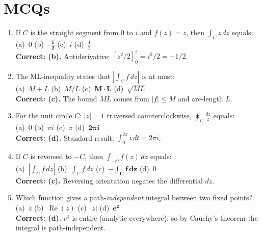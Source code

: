 \documentclass[12pt,a4paper]{article}
\begin{document}
\section{MCQs}
\begin{enumerate}[label=\textbf{Q\arabic*.}, leftmargin=*]

  \item If $C$ is the straight segment from $0$ to $i$ and $f(z)=z$, then
        $\int_C z\,dz$ equals:\\[2pt]
        (a)\ $0$ \quad
        (b)\ $\textbf{-}\,\mathbf{\tfrac{1}{2}}$\quad
        (c)\ $i$ \quad
        (d)\ $\tfrac{1}{2}$\\[2pt]
        \textbf{Correct: (b).}
        Antiderivative: $[z^2/2]_0^i = i^2/2 = -1/2$.

  \item The ML-inequality states that $|\int_C f\,dz|$ is at most:\\[2pt]
        (a)\ $M+L$ \quad
        (b)\ $M/L$ \quad
        (c)\ $\mathbf{M \cdot L}$ \quad
        (d)\ $\sqrt{ML}$\\[2pt]
        \textbf{Correct: (c).}
        The bound $ML$ comes from $|f|\le M$ and arc-length $L$.

  \item For the unit circle $C$: $|z|=1$ traversed counterclockwise,
        $\oint_C \frac{dz}{z}$ equals:\\[2pt]
        (a)\ $0$ \quad
        (b)\ $\pi i$ \quad
        (c)\ $\pi$ \quad
        (d)\ $\mathbf{2\pi i}$\\[2pt]
        \textbf{Correct: (d).}
        Standard result: $\int_0^{2\pi} i\,dt = 2\pi i$.

  \item If $C$ is reversed to $-C$, then $\int_{-C} f(z)\,dz$ equals:\\[2pt]
        (a)\ $|\int_C f\,dz|$ \quad
        (b)\ $\overline{\int_C f\,dz}$ \quad
        (c)\ $\mathbf{-\int_C f\,dz}$ \quad
        (d)\ $0$\\[2pt]
        \textbf{Correct: (c).}
        Reversing orientation negates the differential $dz$.

  \item Which function gives a path-\emph{independent} integral between
        two fixed points?\\[2pt]
        (a)\ $\overline{z}$ \quad
        (b)\ $\operatorname{Re}(z)$ \quad
        (c)\ $|z|$ \quad
        (d)\ $\mathbf{e^z}$\\[2pt]
        \textbf{Correct: (d).}
        $e^z$ is entire (analytic everywhere), so by Cauchy's theorem the
        integral is path-independent.

\end{enumerate}
\end{document}
